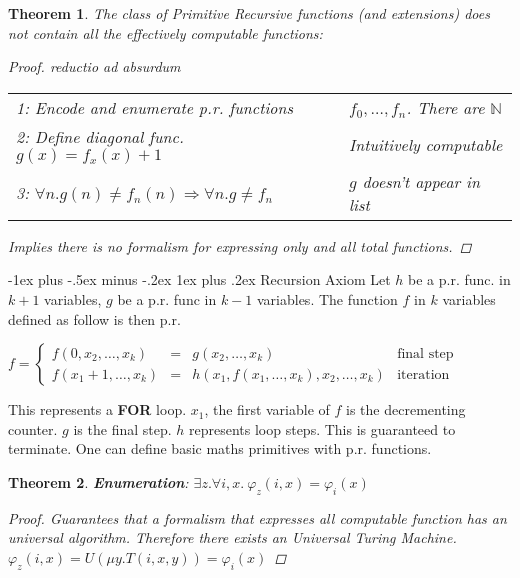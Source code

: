 \documentclass[10pt,landscape]{article}
\makeatletter
\newcommand{\impl}{\Rightarrow}
\newcommand{\N}{\mathbb{N}}
\theoremstyle{plain}%
\newtheorem*{thm}{Theorem}
\theoremstyle{definition}
\theoremstyle{remark}
\renewcommand{\subsubsection}{\@startsection{subsubsection}{3}{0mm}%
                                {-1ex plus -.5ex minus -.2ex}%
                                {1ex plus .2ex}%
                                {\normalfont\small\bfseries}}
\makeatother
\begin{document}
\begin{multicols}{3}
\begin{thm}
    The class of Primitive Recursive functions (and extensions) does not contain all the effectively computable functions:
    \begin{proof}
        reductio ad absurdum
        \begin{tabular}{@{}ll@{}}
            1: Encode and enumerate p.r. functions & $f_0, \hdots, f_n $. There are $\N$ \\ 
            2: Define diagonal func. $g(x) = f_x(x)+1$ & Intuitively computable \\
            3: $\forall n . g(n) \neq f_n(n) \impl \forall n . g \neq f_n $ & $g$ doesn't appear in list \\ 
          
        \end{tabular}
        Implies there is no formalism for expressing only and all total functions. 
    \end{proof}
\end{thm}

\subsubsection{Recursion Axiom}
Let $h$ be a p.r. func. in $k+1$ variables, $g$ be a p.r. func in $k-1$ variables.
The function $f$ in $k$ variables defined as follow is then p.r.

\begin{center}
    $f = \left\lbrace \begin{matrix}
        f(0,x_2,\hdots,x_k) & = & g(x_2, \hdots, x_k) & \text{final step} \\ 
        f(x_1 + 1, \hdots, x_k) & = & h(x_1, f(x_1, \hdots, x_k), x_2, \hdots, x_k) & \text{iteration} 
    \end{matrix} \right.$
\end{center}

This represents a \textbf{FOR} loop. $x_1$, the first variable of $f$ is the decrementing counter.
$g$ is the final step. $h$ represents loop steps.
This is guaranteed to terminate. One can define basic maths primitives with p.r. functions.
\columnbreak

\begin{thm}
    \textbf{Enumeration}: $\exists z . \forall i,x .\ \varphi_z(i,x) = \varphi_i(x)$ 
    \begin{proof}
        Guarantees that a formalism that expresses all computable function has
        an universal algorithm. Therefore there exists an \textit{Universal Turing Machine}.
        $\varphi_z(i,x) = U(\mu y. T(i, x, y)) = \varphi_i(x)$
    \end{proof}
\end{thm}

\end{multicols}
\end{document}
